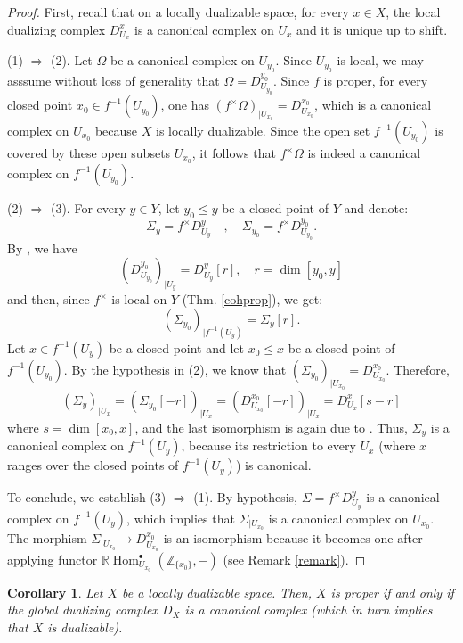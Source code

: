 \documentclass[amssymb,amscd,11pt,20pt]{amsart}
\newcommand{\ZZ}{{\mathbb Z}}
\newcommand{\RR}{\mathbb R}
\newcommand{\0}{\mathbf 0}
\DeclareMathOperator{\Hom}{{Hom}}
\newcommand{\pun}{{\scriptscriptstyle \bullet}}
\theoremstyle{plain}
\newtheorem{cor}[thm]{Corollary}
\numberwithin{equation}{thm}
\begin{document}
\begin{proof} First, recall that on a locally dualizable space, for every $x\in X$, the local dualizing complex $D_{U_x}^x$ is a canonical complex on $U_x$  and it is unique up to shift.

(1) $\Rightarrow$ (2). Let $\Omega $ be a canonical complex on $U_{y_0}$. Since $U_{y_0}$ is local, we may asssume without loss of generality that $\Omega=D_{U_{y_0}}^{y_0}$. Since $f$ is proper, for every closed point $x_0\in f^{-1}(U_{y_0})$, one has $ (f^\times \Omega)_{\vert U_{x_0}}=D_{U_{x_0}}^{x_0}$, which is a canonical complex on $U_{x_0}$  because  $X$ is locally dualizable.  Since the open set $f^{-1}(U_{y_0})$ is covered by these open subsets $U_{x_0}$, it follows that $f^\times \Omega$ is indeed a canonical complex on $f^{-1}(U_{y_0})$.

(2) $\Rightarrow$ (3). For every $y\in Y$, let $y_0\leq y$ be a closed point of $Y$ and denote: $$\Sigma_y=f^\times D_{U_y}^y\quad ,\quad \Sigma_{y_0}=f^\times D_{U_{y_0}}^{y_0}.$$   By \cite[Thm. 4.16]{ST2}, we have 
\[(D_{U_{y_0}}^{y_0})_{\vert U_y}=D_{U_y}^y[r],\quad r=\dim [y_0,y]\] and then, since $f^\times $ is local on $Y$ (Thm. \ref{cohprop}), we get: 
\[ (\Sigma_{y_0})_{\vert f^{-1}(U_y)}= \Sigma_y[r].\] Let $x\in f^{-1}(U_y)$ be a closed point and let $x_0\leq x$ be a closed point of $f^{-1}(U_{y_0})$. By the hypothesis in (2), we know that $(\Sigma_{y_0})_{\vert U_{x_0}}=D_{U_{x_0}}^{x_0}$. Therefore,
\[(\Sigma_y)_{\vert U_x}=(\Sigma_{y_0}[-r])_{\vert U_x} = (D_{U_{x_0}}^{x_0}[-r])_{\vert U_x} = D_{U_x}^x[s-r]\] where $s=\dim[x_0,x]$, and the last isomorphism is again due to \cite[Thm. 4.16]{ST2}. Thus, $\Sigma_y$ is a canonical complex on $f^{-1}(U_y)$, because its restriction to every $U_x$ (where $x$ ranges over the  closed points of $f^{-1}(U_y)$) is canonical.



To conclude, we establish  (3) $\Rightarrow$ (1).  By hypothesis, $\Sigma=f^\times D_{U_y}^y$ is a canonical complex on $f^{-1}(U_y)$, which implies that $\Sigma_{\vert U_{x_0}}$ is a canonical complex on $U_{x_0}$. The morphism $\Sigma_{\vert U_{x_0}}\to D_{U_{x_0}}^{x_0}$ is an isomorphism because it becomes one  after applying functor  $\RR\Hom^\pun_{U_{x_0}}(\ZZ_{\{x_0\}},-)$ (see Remark \ref{remark}).
\end{proof}




\begin{cor}\label{dualizante=canonico} Let  $X$ be a locally dualizable space. Then, $X$ is proper if and only if the global dualizing complex  $D_X$ is a canonical complex (which in turn implies that  $X$ is dualizable).
\end{cor}
\end{document}
